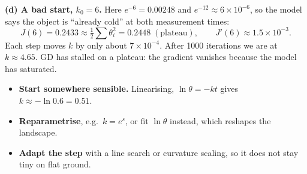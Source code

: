 \begin{frame}{}
  \textbf{(d) A bad start, $k_0 = 6$.} Here $e^{-6} = 0.00248$ and $e^{-12} \approx 6\times10^{-6}$, so the model says
  the object is ``already cold'' at both measurement times:
  \[
    J(6) = 0.2433 \approx \tfrac12\textstyle\sum\theta_i^2 = 0.2448 \;(\text{plateau}),\qquad
    J'(6) \approx 1.5\times10^{-3}.
  \]
  Each step moves $k$ by only about $7\times10^{-4}$. After \alert{1000 iterations} we are at $k \approx 4.65$.
  GD has \alert{stalled on a plateau}: the gradient vanishes because the model has saturated.

  \vspace{4pt}
  \begin{keybox}
    \small
    \begin{itemize}
      \item \textbf{Start somewhere sensible.} Linearising, $\ln\theta = -kt$ gives $k \approx -\ln 0.6 = 0.51$.
      \item \textbf{Reparametrise}, e.g.\ $k = e^{s}$, or fit $\ln\theta$ instead, which reshapes the landscape.
      \item \textbf{Adapt the step} with a line search or curvature scaling, so it does not stay tiny on flat ground.
    \end{itemize}
  \end{keybox}
\end{frame}
